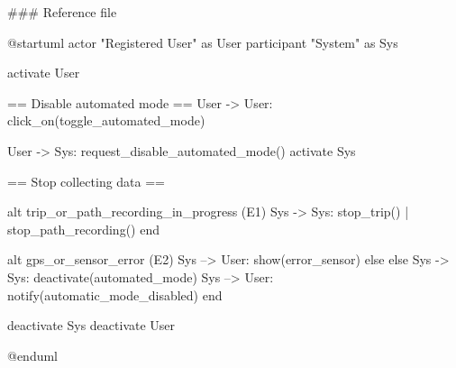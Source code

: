 ### Reference file


@startuml
actor "Registered User" as User
participant "System" as Sys

activate User


== Disable automated mode ==
User -> User: click_on(toggle_automated_mode)

User -> Sys: request_disable_automated_mode()
activate Sys

== Stop collecting data ==

alt trip_or_path_recording_in_progress (E1)
    Sys -> Sys: stop_trip() | stop_path_recording()
end

alt gps_or_sensor_error (E2)
    Sys --> User: show(error_sensor)
else else
    Sys -> Sys: deactivate(automated_mode)
    Sys --> User: notify(automatic_mode_disabled)
end


deactivate Sys
deactivate User

@enduml
